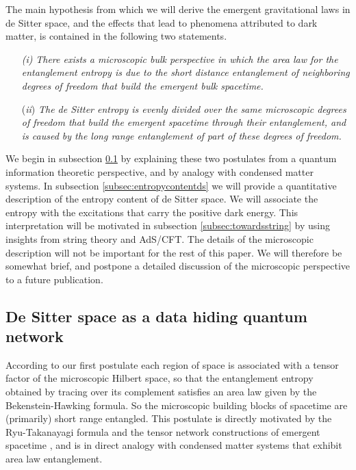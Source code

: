\documentclass[a4paper,12pt]{article}
\begin{document}
The main hypothesis from which we will derive the emergent gravitational laws in de Sitter space, and the effects that lead to phenomena attributed to dark matter, is contained in the following two statements.  
\begin{itemize}
\item[{\it (i)}] {\it There exists a microscopic {{bulk}} perspective in which the area law for the entanglement entropy is due to the {{short distance entanglement}}  of neighboring degrees of freedom that build the emergent bulk spacetime.}
\item[({\it ii})] {\it The de Sitter entropy is evenly divided over the same  microscopic  degrees of freedom that build the emergent spacetime through their entanglement, and is caused by the {{long range entanglement}} of part of these degrees of freedom. }
\end{itemize}  


\noindent We begin in subsection \ref{subsec:datahiding} by explaining these two postulates from a quantum information theoretic perspective, and by analogy with condensed matter systems. In subsection \ref{subsec:entropycontentds} we will provide a quantitative description of the entropy content of de Sitter space. We will associate the entropy with the excitations that carry  the positive dark energy. This interpretation will be motivated in subsection \ref{subsec:towardsstring} by using insights from string theory and AdS/CFT. The details of the microscopic description will not be important for the rest of this paper. We will therefore be somewhat brief, and postpone a detailed discussion of the microscopic perspective to a future publication. 



\subsection{De Sitter space as a data hiding quantum network}

\label{subsec:datahiding}

According to our first postulate each region of space is associated with a tensor factor of the microscopic Hilbert space, so that the entanglement entropy obtained by tracing over its complement satisfies an area law given by the Bekenstein-Hawking formula. So the microscopic building blocks of spacetime are (primarily) short range entangled. This postulate is directly motivated by the Ryu-Takanayagi formula and the tensor network constructions of emergent spacetime \cite{MERA, HarlowPreskill,Haydenetal}, and is in direct analogy with condensed matter systems that exhibit area law entanglement.
 
\end{document}

